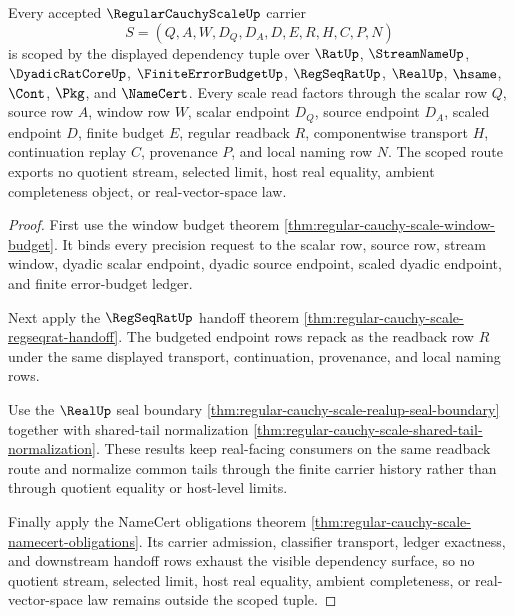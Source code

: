 \begin{theorem}
\label{thm:regular-cauchy-scale-scoped-closure-route}
Every accepted $\RegularCauchyScaleUp$ carrier
$$
S=(Q,A,W,D_Q,D_A,D,E,R,H,C,P,N)
$$
is scoped by the displayed dependency tuple over $\RatUp$, $\StreamNameUp$, $\DyadicRatCoreUp$, $\FiniteErrorBudgetUp$, $\RegSeqRatUp$, $\RealUp$, $\hsame$, $\Cont$, $\Pkg$, and $\NameCert$. Every scale read factors through the scalar row $Q$, source row $A$, window row $W$, scalar endpoint $D_Q$, source endpoint $D_A$, scaled endpoint $D$, finite budget $E$, regular readback $R$, componentwise transport $H$, continuation replay $C$, provenance $P$, and local naming row $N$. The scoped route exports no quotient stream, selected limit, host real equality, ambient completeness object, or real-vector-space law.
\end{theorem}
\begin{proof}
First use the window budget theorem \autoref{thm:regular-cauchy-scale-window-budget}. It binds every precision request to the scalar row, source row, stream window, dyadic scalar endpoint, dyadic source endpoint, scaled dyadic endpoint, and finite error-budget ledger.

Next apply the $\RegSeqRatUp$ handoff theorem \autoref{thm:regular-cauchy-scale-regseqrat-handoff}. The budgeted endpoint rows repack as the readback row $R$ under the same displayed transport, continuation, provenance, and local naming rows.

Use the $\RealUp$ seal boundary \autoref{thm:regular-cauchy-scale-realup-seal-boundary} together with shared-tail normalization \autoref{thm:regular-cauchy-scale-shared-tail-normalization}. These results keep real-facing consumers on the same readback route and normalize common tails through the finite carrier history rather than through quotient equality or host-level limits.

Finally apply the NameCert obligations theorem \autoref{thm:regular-cauchy-scale-namecert-obligations}. Its carrier admission, classifier transport, ledger exactness, and downstream handoff rows exhaust the visible dependency surface, so no quotient stream, selected limit, host real equality, ambient completeness, or real-vector-space law remains outside the scoped tuple.
\end{proof}

